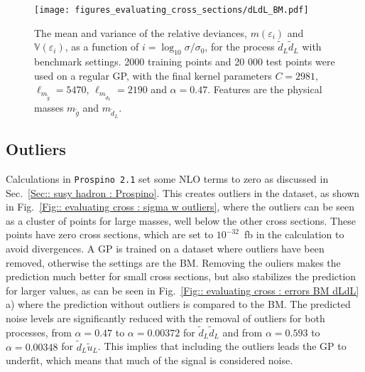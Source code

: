 \documentclass[twoside,english]{uiofysmaster}
\begin{document}
\begin{figure}
\centering
\texttt{[image: figures\_evaluating\_cross\_sections/dLdL\_BM.pdf]}
\caption{The mean and variance of the relative deviances, $m(\varepsilon_i)$ and $\mathbb{V}(\varepsilon_i)$, as a function of $i = \log_{10} \sigma / \sigma_0$, for the process $\tilde{d}_L \tilde{d}_L$ with benchmark settings. 2000 training points and 20 000 test points were used on a regular GP, with the final kernel parameters $C=2981$, $\ell_{m_{\tilde{g}}}=5470$, $\ell_{m_{\tilde{d}_L}}=2190$ and $\alpha=0.47$. Features are the physical masses $m_{\tilde{g}}$ and $m_{\tilde{d}_L}$.}
\label{Fig:: evaluating cross : BM dLdL error plot}
\end{figure}


\subsection{Outliers}

Calculations in \verb|Prospino 2.1| set some NLO terms to zero as discussed in Sec.~\ref{Sec:: susy hadron : Prospino}. This creates outliers in the dataset, as shown in Fig.~\ref{Fig:: evaluating cross : sigma w outliers}, where the outliers can be seen as a cluster of points for large masses, well below the other cross sections. These points have zero cross sections, which are set to $10^{-32}$~fb in the calculation to avoid divergences. A GP is trained on a dataset where outliers have been removed, otherwise the settings are the BM. Removing the ouliers makes the prediction much better for small cross sections, but also stabilizes the prediction for larger values, as can be seen in Fig.~\ref{Fig:: evaluating cross : errors BM dLdL} a) where the prediction without outliers is compared to the BM. The predicted noise levels are significantly reduced with the removal of outliers for both processes, from $\alpha = 0.47$ to $\alpha = 0.00372$ for $\tilde{d}_L \tilde{d}_L$ and from $\alpha = 0.593$ to $\alpha= 0.00348$ for $\tilde{d}_L \tilde{u}_L$. This implies that including the outliers leads the GP to underfit, which means that much of the signal is considered noise.   
\end{document}
